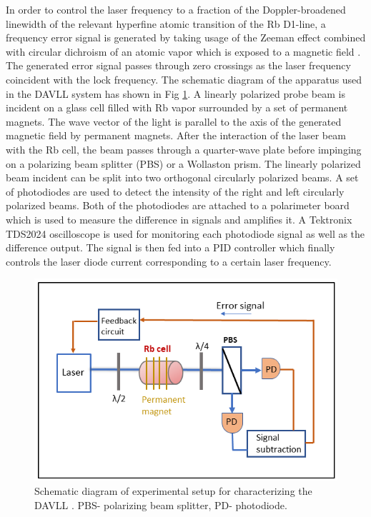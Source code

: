 In order to control the laser frequency to a fraction of the Doppler-broadened linewidth of the relevant hyperfine atomic transition of the Rb D1-line, a frequency error signal is generated by taking usage of the Zeeman effect combined with circular dichroism of an atomic vapor which is exposed to a magnetic field \cite{doi:10.1063/1.3568824}. The generated error signal passes through zero crossings as the laser frequency coincident with the lock frequency. The schematic diagram of the apparatus used in  the DAVLL system has shown in Fig \ref{fig:DAVLL}. A linearly polarized probe beam is incident on a glass cell filled with Rb vapor surrounded by a set of permanent magnets. The wave vector of the light is parallel to the axis of the generated magnetic field by permanent magnets. After the interaction of the laser beam with the Rb cell, the beam passes through a quarter-wave plate before impinging on a polarizing beam splitter (PBS) or a Wollaston prism. The linearly polarized beam incident can be split into two orthogonal circularly polarized beams. A set of photodiodes are used to detect the intensity of the right and left circularly polarized beams. Both of the photodiodes are attached to a polarimeter board which is used to measure the difference in signals and amplifies it. A Tektronix TDS2024 oscilloscope is used for monitoring each photodiode signal as well as the difference output. The signal is then fed into a PID controller which finally controls the laser diode current corresponding to a certain laser frequency.
\begin{figure}[h]
\centering
\includegraphics[width=0.8\linewidth]{figures/DAVLL}
\caption{Schematic diagram of experimental setup for characterizing the DAVLL . PBS- polarizing beam splitter, PD- photodiode.\label{fig:DAVLL}}
\end{figure}
